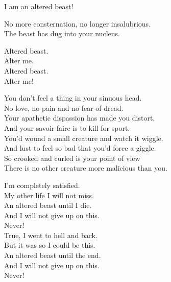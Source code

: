 I am an altered beast! \\





No more consternation, no longer insalubrious. \\
The beast  has dug into your nucleus. \\


Altered beast. \\
Alter me. \\
Altered beast. \\
Alter me! \\





You don't feel a thing in your sinuous head. \\
No love, no pain and no fear of dread. \\

Your apathetic dispassion has made you distort. \\
And your savoir-faire is to kill for sport. \\

You'd wound a small creature and watch it wiggle. \\
And lust to feel so bad that you'd force a giggle. \\

So crooked and curled is your point of view \\
There is no other creature more malicious than you. \\


I'm completely satisfied. \\
My other life I will not miss. \\
An altered beast until I die. \\
And I will not give up on this. \\
Never! \\

True, I went to hell and back. \\
But it was so I could be this. \\
An altered beast until the end. \\
And I will not give up on this. \\
Never! \\

